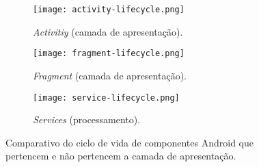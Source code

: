 \begin{figure*}[!htb]
\centering
  \begin{subfigure}[b]{.33\textwidth}
    \centering
    \texttt{[image: activity-lifecycle.png]}
    \caption{\textit{Activitiy} (camada de apresentação).}
    \label{fig:activity-lifecycle}
  \end{subfigure}
  \begin{subfigure}[b]{.33\textwidth}
    \centering
    \texttt{[image: fragment-lifecycle.png]}
    \caption{\textit{Fragment} (camada de apresentação).}
    \label{fig:activity-lifecycle}
  \end{subfigure}
  \begin{subfigure}[b]{.30\textwidth}
    \centering
    \texttt{[image: service-lifecycle.png]}
    \caption{\textit{Services} (processamento).}
    \label{fig:service-lifecycle}
  \end{subfigure}%
\caption{Comparativo do ciclo de vida de componentes Android que pertencem e não pertencem a camada de apresentação.}
\label{fig:android-lifecycles}
\vspace{-.5cm} 
\end{figure*}

